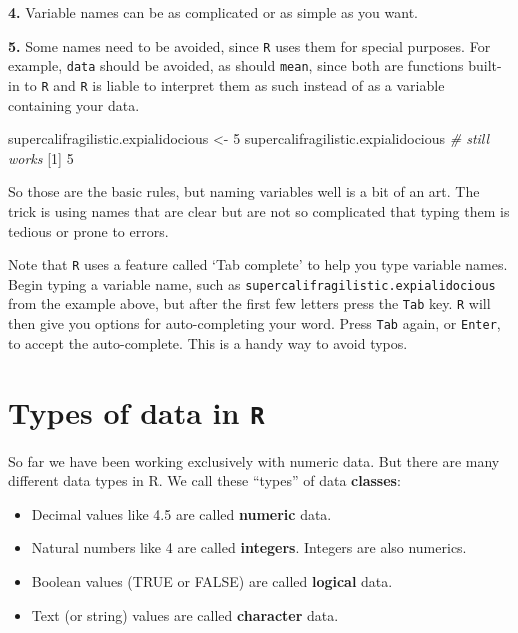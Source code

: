 \documentclass[
]{book}
\newenvironment{Shaded}{\begin{snugshade}}{\end{snugshade}}
\newcommand{\CommentTok}[1]{\textcolor[rgb]{0.56,0.35,0.01}{\textit{#1}}}
\newcommand{\DecValTok}[1]{\textcolor[rgb]{0.00,0.00,0.81}{#1}}
\newcommand{\NormalTok}[1]{#1}
\newcommand{\OtherTok}[1]{\textcolor[rgb]{0.56,0.35,0.01}{#1}}
\providecommand{\tightlist}{%
  \setlength{\itemsep}{0pt}\setlength{\parskip}{0pt}}
\begin{document}
\textbf{4.} Variable names can be as complicated or as simple as you want.

\textbf{5.} Some names need to be avoided, since \texttt{R} uses them for special purposes. For example, \texttt{data} should be avoided, as should \texttt{mean}, since both are functions built-in to \texttt{R} and \texttt{R} is liable to interpret them as such instead of as a variable containing your data.

\begin{Shaded}
\begin{Highlighting}[]
\NormalTok{supercalifragilistic.expialidocious }\OtherTok{\textless{}{-}} \DecValTok{5}
\NormalTok{supercalifragilistic.expialidocious  }\CommentTok{\# still works}
\NormalTok{[}\DecValTok{1}\NormalTok{] }\DecValTok{5}
\end{Highlighting}
\end{Shaded}

So those are the basic rules, but naming variables well is a bit of an art. The trick is using names that are clear but are not so complicated that typing them is tedious or prone to errors.

Note that \texttt{R} uses a feature called `Tab complete' to help you type variable names. Begin typing a variable name, such as \texttt{supercalifragilistic.expialidocious} from the example above, but after the first few letters press the \texttt{Tab} key. \texttt{R} will then give you options for auto-completing your word. Press \texttt{Tab} again, or \texttt{Enter}, to accept the auto-complete. This is a handy way to avoid typos.

\section*{\texorpdfstring{Types of data in \texttt{R}}{Types of data in R}}\label{types-of-data-in-r}

So far we have been working exclusively with numeric data. But there are many different data types in R. We call these ``types'' of data \textbf{classes}:

\begin{itemize}
\tightlist
\item
  Decimal values like 4.5 are called \textbf{numeric} data.
\item
  Natural numbers like 4 are called \textbf{integers}. Integers are also numerics.
\item
  Boolean values (TRUE or FALSE) are called \textbf{logical} data.
\item
  Text (or string) values are called \textbf{character} data.
\end{itemize}
\end{document}
